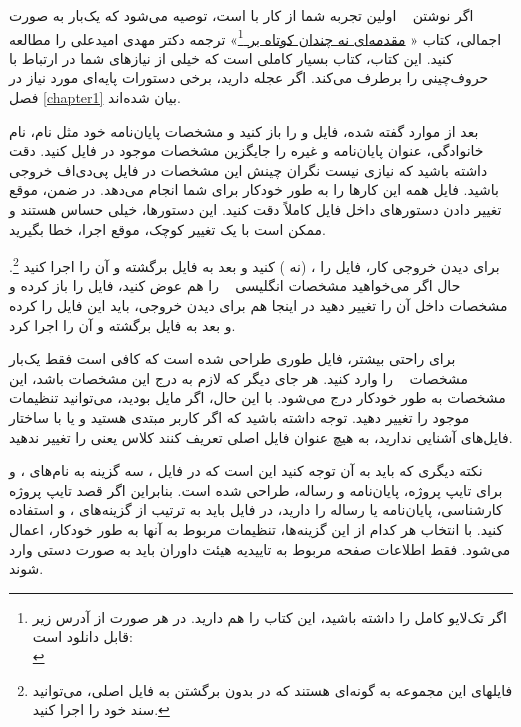 اگر نوشتن \پ~ اولین تجربه شما از کار با 
\XePersian
 است، توصیه می‌شود که یک‌بار به صورت اجمالی، کتاب «%
 \href{http://www.tug.ctan.org/tex-archive/info/lshort/persian/lshort.pdf}{مقدمه‌ای نه چندان کوتاه بر
     \lr{\LaTeXe}}\footnote{اگر تک‌لایو کامل را داشته باشید، این کتاب را هم دارید. در هر صورت از آدرس زیر قابل دانلود است:\\
     }»
 ترجمه دکتر مهدی امیدعلی را مطالعه کنید. این کتاب، کتاب بسیار کاملی است که خیلی از نیازهای شما در ارتباط با حروف‌چینی را برطرف می‌کند.
 اگر عجله دارید، برخی دستورات پایه‌ای مورد نیاز در فصل
  \ref{chapter1}
   بیان شده‌اند.
 \par
 بعد از موارد گفته شده، فایل 
 و
 را باز کنید و مشخصات پایان‌نامه خود مثل نام، نام خانوادگی، عنوان پایان‌نامه و غیره را جایگزین مشخصات موجود در فایل
 کنید. دقت داشته باشید که نیازی نیست نگران چینش این مشخصات در فایل پی‌دی‌اف خروجی باشید. فایل 
 همه این کارها را به طور خودکار برای شما انجام می‌دهد. در ضمن، موقع تغییر دادن دستورهای داخل فایل
 کاملاً دقت کنید. این دستورها، خیلی حساس هستند و ممکن است با یک تغییر کوچک، موقع اجرا، خطا بگیرید. 
 \par
 برای دیدن خروجی کار، فایل 
 را 
 ، 
 (نه 
 )
 کنید و بعد به فایل 
 برگشته و آن را اجرا کنید%
 \footnote{%
     فایلهای این مجموعه به گونه‌ای هستند که در 
     بدون برگشتن به فایل اصلی، می‌توانید سند خود را اجرا کنید.%
 }.
 حال اگر می‌خواهید مشخصات انگلیسی \پ~ را هم عوض کنید، فایل 
 را باز کرده و مشخصات داخل آن را تغییر دهید%
 در اینجا هم برای دیدن خروجی، باید این فایل را 
 کرده و بعد به فایل 
 برگشته و آن را اجرا کرد.
 \par
 برای راحتی بیشتر، فایل 
 طوری طراحی شده است که کافی است فقط  یک‌بار مشخصات \پ~ را وارد کنید. هر جای دیگر که لازم به درج این مشخصات باشد، این مشخصات به طور خودکار درج می‌شود. با این حال، اگر مایل بودید، می‌توانید تنظیمات موجود را تغییر دهید. توجه داشته باشید که اگر کاربر مبتدی هستید و یا با ساختار فایل‌های  
 آشنایی ندارید، به هیچ عنوان فایل اصلی تعریف کنند کلاس یعنی
را تغییر ندهید.
 \par
 نکته دیگری که باید به آن توجه کنید این است که در فایل 
 ،
 سه گزینه به نام‌های
 ،
 و
 برای تایپ پروژه، پایان‌نامه و رساله،
 طراحی شده است. بنابراین اگر قصد تایپ پروژه کارشناسی، پایان‌نامه یا رساله را دارید، 
 در فایل 
 باید به ترتیب از گزینه‌های
 ،
 و
 استفاده کنید. با انتخاب هر کدام از این گزینه‌ها، تنظیمات مربوط به آنها به طور خودکار، اعمال می‌شود.    
 فقط اطلاعات صفحه مربوط به تاییدیه هیئت داوران باید به صورت دستی وارد شوند.
 
